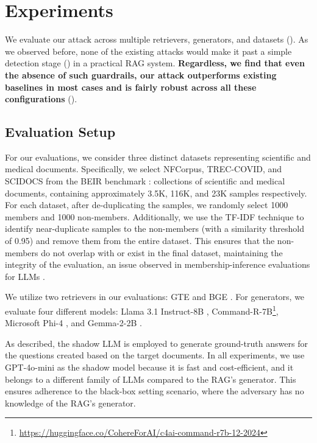 \section{Experiments}
\label{sec:experiments}

We evaluate our attack across multiple retrievers, generators, and datasets (). As we observed before, none of the existing attacks would make it past a simple detection stage () in a practical RAG system. \textbf{Regardless, we find that even the absence of such guardrails, our attack outperforms existing baselines in most cases and is fairly robust across all these configurations} ().

\subsection{Evaluation Setup}
\label{sec:exp_setting}
 For our evaluations, we consider three distinct datasets representing scientific and medical documents. Specifically, we select NFCorpus, TREC-COVID, and SCIDOCS from the BEIR benchmark \citep{thakur2021beir}: collections of scientific and medical documents, containing approximately 3.5K, 116K, and 23K samples respectively.
For each dataset, after de-duplicating the samples, we randomly select 1000 members and 1000 non-members. Additionally, we use the TF-IDF technique to identify near-duplicate samples to the non-members (with a similarity threshold of 0.95) and remove them from the entire dataset. This ensures that the non-members do not overlap with or exist in the final dataset, maintaining the integrity of the evaluation, an issue observed in membership-inference evaluations for LLMs \citep{duan2024membership, maini2024llm, das2024blind, meeus2024sok}.

 We utilize two retrievers in our evaluations: GTE \citep{li2023towards} and BGE \citep{li2023towards}. For generators, we evaluate four different models: Llama 3.1 Instruct-8B \citep{dubey2024llama}, Command-R-7B\footnote{\url{https://huggingface.co/CohereForAI/c4ai-command-r7b-12-2024}}, Microsoft Phi-4 \citep{abdin2024phi}, and Gemma-2-2B \citep{team2024gemma}.

 As described, the shadow LLM is employed to generate ground-truth answers for the questions created based on the target documents. In all experiments, we use GPT-4o-mini as the shadow model because it is fast and cost-efficient, and it belongs to a different family of LLMs compared to the RAG's generator. This ensures adherence to the black-box setting scenario, where the adversary has no knowledge of the RAG's generator.


